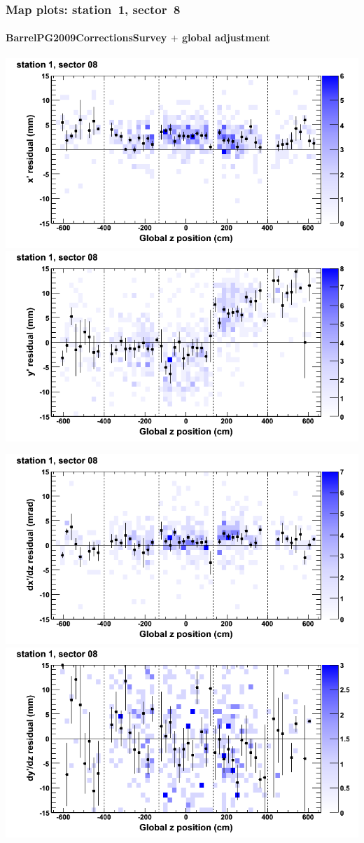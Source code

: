 \documentclass[compress]{beamer}
\begin{document}
\begin{frame}
\frametitle{Map plots: station~1, sector~8}
\framesubtitle{BarrelPG2009CorrectionsSurvey $+$ global adjustment}
\includegraphics[width=0.5\linewidth]{mapplots_re01/DTvsz_st1sec08_x.png}
\includegraphics[width=0.5\linewidth]{mapplots_re01/DTvsz_st1sec08_y.png}

\includegraphics[width=0.5\linewidth]{mapplots_re01/DTvsz_st1sec08_dxdz.png}
\includegraphics[width=0.5\linewidth]{mapplots_re01/DTvsz_st1sec08_dydz.png}
\end{frame}
\end{document}
